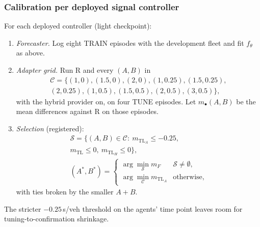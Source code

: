 \subsubsection{Calibration per deployed signal controller}
For each deployed controller (light checkpoint):
\begin{enumerate}\setlength\itemsep{0pt}
\item \emph{Forecaster.} Log eight TRAIN episodes with the development fleet and fit $f_\theta$ as above.
\item \emph{Adapter grid.} Run R and every $(A,B)$ in
\begin{multline*}\mathcal C=\{(1,0),(1.5,0),(2,0),(1,0.25),(1.5,0.25),\\(2,0.25),(1,0.5),(1.5,0.5),(2,0.5),(3,0.5)\},\end{multline*}
with the hybrid provider on, on four TUNE episodes. Let $m_\bullet(A,B)$ be the mean differences against R on those episodes.
\item \emph{Selection} (registered):
\begin{gather}
\mathcal S=\{(A,B)\in\mathcal C:\ m_{\mathrm{TL}_A}\le-0.25,\\ m_{\mathrm{TL}}\le0,\ m_{\mathrm{TL}_H}\le0\},\\
(A^*,B^*)=\begin{cases}\arg\min_{\mathcal S} m_{F} & \mathcal S\neq\emptyset,\\ \arg\min_{\mathcal C} m_{\mathrm{TL}_A} & \text{otherwise,}\end{cases}
\end{gather}
with ties broken by the smaller $A+B$.
\end{enumerate}
The stricter $-0.25$\,s/veh threshold on the agents' time point leaves room for tuning-to-confirmation shrinkage.
